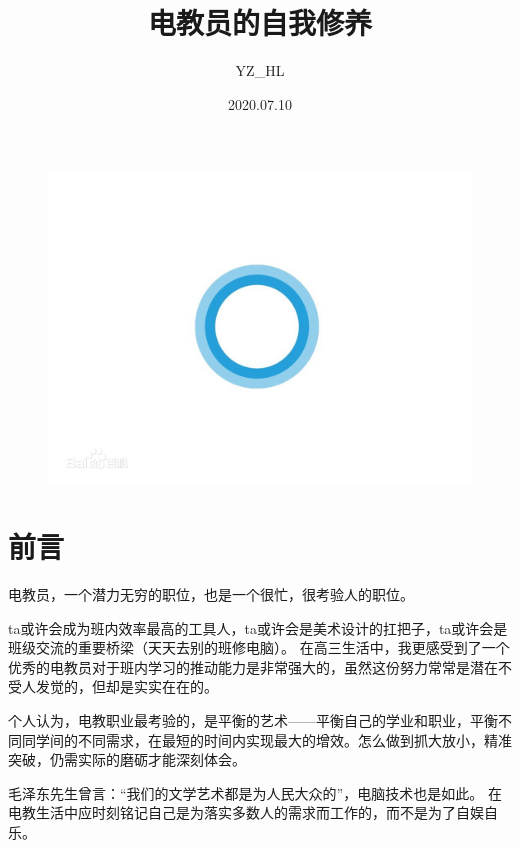 \documentclass[a5paper]{article}
\begin{document}
\title{电教员的自我修养}
\author{YZ\_HL}
\date{2020.07.10}
\maketitle

\begin{figure}[htbp]
\centering
\includegraphics[scale=0.3]{cover-p1.jpg}
\end{figure}

\thispagestyle{empty}
\newpage

\tableofcontents
\thispagestyle{empty}
\newpage

\setcounter{page}{1}

\section{前言}
电教员，一个潜力无穷的职位，也是一个很忙，很考验人的职位。

ta或许会成为班内效率最高的工具人，ta或许会是美术设计的扛把子，ta或许会是班级交流的重要桥梁（天天去别的班修电脑）。
在高三生活中，我更感受到了一个优秀的电教员对于班内学习的推动能力是非常强大的，虽然这份努力常常是潜在不受人发觉的，但却是实实在在的。

个人认为，电教职业最考验的，是平衡的艺术——平衡自己的学业和职业，平衡不同同学间的不同需求，在最短的时间内实现最大的增效。怎么做到抓大放小，精准突破，仍需实际的磨砺才能深刻体会。

毛泽东先生曾言：“我们的文学艺术都是为人民大众的”，电脑技术也是如此。
在电教生活中应时刻铭记自己是为落实多数人的需求而工作的，而不是为了自娱自乐。
\end{document}
